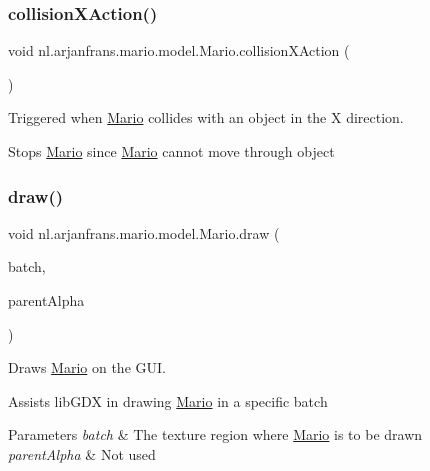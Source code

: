\subsubsection{\texorpdfstring{collision\+X\+Action()}{collisionXAction()}}
{\footnotesize\ttfamily void nl.\+arjanfrans.\+mario.\+model.\+Mario.\+collision\+X\+Action (\begin{DoxyParamCaption}{ }\end{DoxyParamCaption})\hspace{0.3cm}{\ttfamily [protected]}}



Triggered when \hyperlink{classnl_1_1arjanfrans_1_1mario_1_1model_1_1Mario}{Mario} collides with an object in the X direction. 

Stops \hyperlink{classnl_1_1arjanfrans_1_1mario_1_1model_1_1Mario}{Mario} since \hyperlink{classnl_1_1arjanfrans_1_1mario_1_1model_1_1Mario}{Mario} cannot move through object \mbox{\label{classnl_1_1arjanfrans_1_1mario_1_1model_1_1Mario_a50937f347ddf9eb8f114ad78e57e559c}} 
\subsubsection{\texorpdfstring{draw()}{draw()}}
{\footnotesize\ttfamily void nl.\+arjanfrans.\+mario.\+model.\+Mario.\+draw (\begin{DoxyParamCaption}\item[{Batch}]{batch,  }\item[{float}]{parent\+Alpha }\end{DoxyParamCaption})}



Draws \hyperlink{classnl_1_1arjanfrans_1_1mario_1_1model_1_1Mario}{Mario} on the G\+UI. 

Assists lib\+G\+DX in drawing \hyperlink{classnl_1_1arjanfrans_1_1mario_1_1model_1_1Mario}{Mario} in a specific batch 
\begin{DoxyParams}{Parameters}
{\em batch} & The texture region where \hyperlink{classnl_1_1arjanfrans_1_1mario_1_1model_1_1Mario}{Mario} is to be drawn \\
\hline
{\em parent\+Alpha} & Not used \\
\hline
\end{DoxyParams}
\mbox{\label{classnl_1_1arjanfrans_1_1mario_1_1model_1_1Mario_a73c861a72b4a0ec8c7e87da0da5dac47}} 
